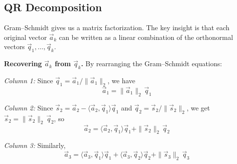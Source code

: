 \documentclass[10pt, twocolumn]{article}
\theoremstyle{definition}
\theoremstyle{plain}
\begin{document}
\begin{center}
\end{center}

\subsection{QR Decomposition}

Gram--Schmidt gives us a matrix factorization. The key insight is that each original vector $\vec{a}_k$ can be written as a linear combination of the orthonormal vectors $\vec{q}_1, \ldots, \vec{q}_k$.

\textbf{Recovering $\vec{a}_k$ from $\vec{q}_k$.} By rearranging the Gram--Schmidt equations:

\textit{Column 1:} Since $\vec{q}_1 = \vec{a}_1 / \|\vec{a}_1\|_2$, we have
\[
    \vec{a}_1 = \|\vec{a}_1\|_2 \, \vec{q}_1
\]

\textit{Column 2:} Since $\vec{s}_2 = \vec{a}_2 - \langle \vec{a}_2, \vec{q}_1 \rangle \vec{q}_1$ and $\vec{q}_2 = \vec{s}_2 / \|\vec{s}_2\|_2$, we get $\vec{s}_2 = \|\vec{s}_2\|_2 \, \vec{q}_2$, so
\[
    \vec{a}_2 = \langle \vec{a}_2, \vec{q}_1 \rangle \vec{q}_1 + \|\vec{s}_2\|_2 \, \vec{q}_2
\]

\textit{Column 3:} Similarly,
\[
    \vec{a}_3 = \langle \vec{a}_3, \vec{q}_1 \rangle \vec{q}_1 + \langle \vec{a}_3, \vec{q}_2 \rangle \vec{q}_2 + \|\vec{s}_3\|_2 \, \vec{q}_3
\]
\end{document}
